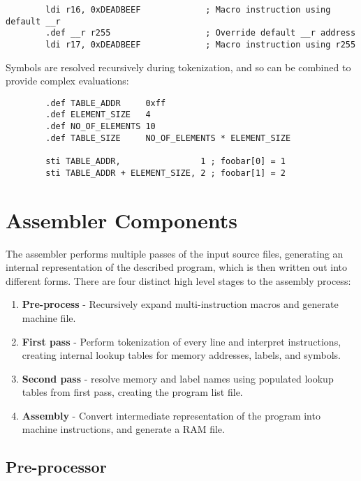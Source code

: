 \documentclass[12pt,twoside]{report}
\begin{document}
\begin{verbatim}
        ldi r16, 0xDEADBEEF             ; Macro instruction using default __r
        .def __r r255                   ; Override default __r address
        ldi r17, 0xDEADBEEF             ; Macro instruction using r255
\end{verbatim}

Symbols are resolved recursively during tokenization, and so can be
combined to provide complex evaluations:

\begin{verbatim}
        .def TABLE_ADDR     0xff
        .def ELEMENT_SIZE   4
        .def NO_OF_ELEMENTS 10
        .def TABLE_SIZE     NO_OF_ELEMENTS * ELEMENT_SIZE

        sti TABLE_ADDR,                1 ; foobar[0] = 1
        sti TABLE_ADDR + ELEMENT_SIZE, 2 ; foobar[1] = 2
\end{verbatim}

\chapter{Assembler Components}

The assembler performs multiple passes of the input source files,
generating an internal representation of the described program, which
is then written out into different forms. There are four distinct high
level stages to the assembly process:

\begin{enumerate}
\item \textbf{Pre-process} - Recursively expand multi-instruction
  macros and generate machine file.
\item \textbf{First pass} - Perform tokenization of every line and
  interpret instructions, creating internal lookup tables for memory
  addresses, labels, and symbols.
\item \textbf{Second pass} - resolve memory and label names using
  populated lookup tables from first pass, creating the program list
  file.
\item \textbf{Assembly} - Convert intermediate representation of the
  program into machine instructions, and generate a RAM file.
\end{enumerate}

\section{Pre-processor}
\end{document}
